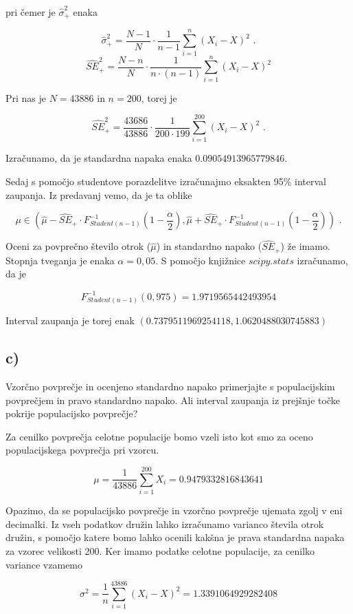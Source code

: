 \documentclass[12pt, a4paper]{article}
\begin{document}
pri čemer je $\hat{\sigma}_+^2$ enaka 

$$\hat{\sigma}_+^2 = \frac{N-1}{N} \cdot \frac{1}{n-1} \sum_{i=1}^{n} (X_i - X)^2 \text{ .} $$ $$
\hat{SE}_+^2 = \frac{N-n}{N} \cdot \frac{1}{n\cdot(n-1)} \sum_{i=1}^{n} (X_i - X)^2
$$

Pri nas je $ N = 43886 $ in $ n = 200 $, torej je

$$ \hat{SE}_+^2 = \frac{43686}{43886} \cdot \frac{1}{200\cdot199} \sum_{i=1}^{200} (X_i - X)^2 \text{ .}
$$

Izračunamo, da je standardna napaka enaka $ 0.09054913965779846 $.

Sedaj s pomočjo studentove porazdelitve izračunajmo eksakten 95\% interval zaupanja.
Iz predavanj vemo, da je ta oblike

$$ \mu \in (\hat{\mu} - \hat{SE}_+ \cdot F^{-1}_{Student(n-1)}(1-\frac{\alpha}{2}),\hat{\mu} + \hat{SE}_+ \cdot F^{-1}_{Student(n-1)}(1-\frac{\alpha}{2}) ) \text{ .}
$$

Oceni za povprečno število otrok ($\hat{\mu}$) in standardno napako ($\hat{SE}_+$)
že imamo. Stopnja tveganja je enaka $\alpha = 0,05$. S pomočjo knjižnice $scipy.stats$ izračunamo, da je 

$$ F^{-1}_{Student(n-1)}(0,975) = 1.9719565442493954
$$

Interval zaupanja je torej enak $(0.7379511969254118, 1.0620488030745883)$

\subsection{c)}
Vzorčno povprečje in ocenjeno standardno napako primerjajte s populacijskim
povprečjem in pravo standardno napako. Ali interval zaupanja iz prejšnje točke
pokrije populacijsko povprečje?

Za cenilko povprečja celotne populacije bomo vzeli isto kot smo za oceno populacijskega
povprečja pri vzorcu. 

$$ \mu = \frac{1}{43886}\sum^{200}_{i=1} X_i = 0.9479332816843641
$$

Opazimo, da se populacijsko povprečje in vzorčno povprečje ujemata zgolj v eni decimalki.
Iz vseh podatkov družin lahko izračunamo varianco števila otrok družin, s pomočjo
katere bomo lahko ocenili kakšna je prava standardna napaka za vzorec velikosti 200.
Ker imamo podatke celotne populacije, za cenilko variance vzamemo

$$ \sigma^2 = \frac{1}{n} \sum_{i=1}^{43886} (X_i - X)^2 = 1.3391064929282408
$$
\end{document}
